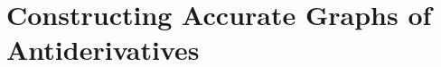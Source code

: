 \section{Constructing Accurate Graphs of Antiderivatives} \label{S:5.1.AntiDGraphs}




\newpage



\newpage



\newpage



\newpage

\clearpage
